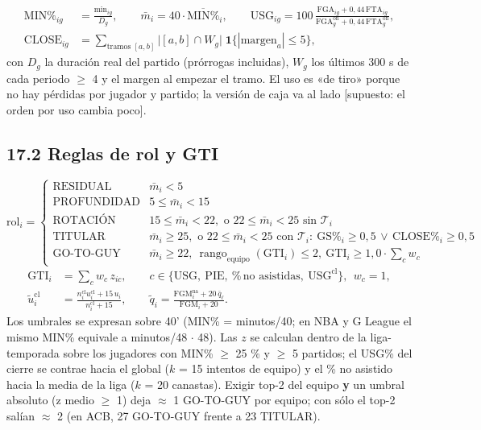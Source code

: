 \documentclass[10pt,a4paper]{article}
\begin{document}
\[
\begin{aligned} \mathrm{MIN\%}_{ig} &= \frac{\mathrm{min}_{ig}}{D_g}, \qquad \bar m_i = 40\cdot\overline{\mathrm{MIN\%}}_i, \qquad \mathrm{USG}_{ig} = 100\,\frac{\mathrm{FGA}_{ig} + 0{,}44\,\mathrm{FTA}_{ig}}{\mathrm{FGA}^{\mathrm{on}}_{g} + 0{,}44\,\mathrm{FTA}^{\mathrm{on}}_{g}},\\ \mathrm{CLOSE}_{ig} &= \sum_{\text{tramos } [a,b]} \big|[a,b] \cap W_g\big|\;\mathbf 1\{|\text{margen}_a| \le 5\}, \end{aligned}
\]
con $D_g$ la duración real del partido (prórrogas incluidas), $W_g$ los últimos 300 s de cada periodo \ensuremath{\geq} 4 y el margen al empezar el tramo. El uso es «de tiro» porque no hay pérdidas por jugador y partido; la versión de caja va al lado [supuesto: el orden por uso cambia poco].

\subsection*{17.2 Reglas de rol y GTI}
\[
\mathrm{rol}_i = \begin{cases} \text{RESIDUAL} & \bar m_i < 5\\ \text{PROFUNDIDAD} & 5 \le \bar m_i < 15\\ \text{ROTACIÓN} & 15 \le \bar m_i < 22, \text{ o } 22 \le \bar m_i < 25 \text{ sin } \mathcal T_i\\ \text{TITULAR} & \bar m_i \ge 25, \text{ o } 22 \le \bar m_i < 25 \text{ con } \mathcal T_i:\ \mathrm{GS\%}_i \ge 0{,}5 \,\lor\, \mathrm{CLOSE\%}_i \ge 0{,}5\\ \text{GO-TO-GUY} & \bar m_i \ge 22,\ \operatorname{rango}_{\mathrm{equipo}}(\mathrm{GTI}_i) \le 2,\ \mathrm{GTI}_i \ge 1{,}0 \cdot \textstyle\sum_c w_c \end{cases}
\]
\[
\begin{aligned} \mathrm{GTI}_i &= \sum_{c} w_c\, z_{ic}, \qquad c \in \{\mathrm{USG},\ \mathrm{PIE},\ \%\,\text{no asistidas},\ \mathrm{USG}^{\mathrm{cl}}\},\ \ w_c = 1,\\ \tilde u^{\mathrm{cl}}_i &= \frac{n^{\mathrm{cl}}_i u^{\mathrm{cl}}_i + 15\,u_i}{n^{\mathrm{cl}}_i + 15}, \qquad \tilde q_i = \frac{\mathrm{FGM}^{\mathrm{na}}_i + 20\,\bar q_\ell}{\mathrm{FGM}_i + 20} . \end{aligned}
\]
Los umbrales se expresan sobre 40' (MIN\% = minutos/40; en NBA y G League el mismo MIN\% equivale a minutos/48 \ensuremath{\cdot} 48). Las $z$ se calculan dentro de la liga-temporada sobre los jugadores con MIN\% \ensuremath{\geq} 25 \% y \ensuremath{\geq} 5 partidos; el USG\% del cierre se contrae hacia el global ($k$ = 15 intentos de equipo) y el \% no asistido hacia la media de la liga ($k$ = 20 canastas). Exigir top-2 del equipo \textbf{y} un umbral absoluto (z medio \ensuremath{\geq} 1) deja \ensuremath{\approx} 1 GO-TO-GUY por equipo; con sólo el top-2 salían \ensuremath{\approx} 2 (en ACB, 27 GO-TO-GUY frente a 23 TITULAR).
\end{document}
